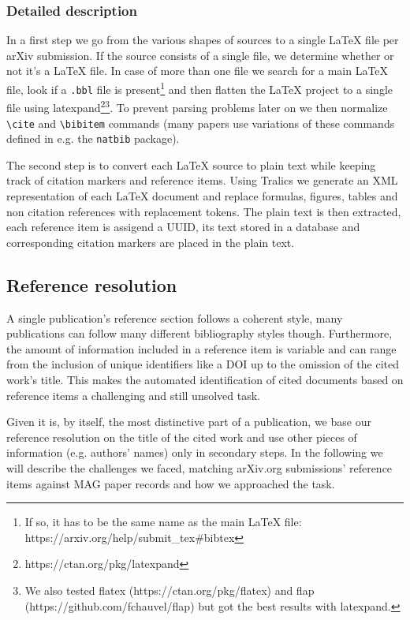 \subsubsection{Detailed description}
In a first step we go from the various shapes of sources to a single LaTeX file per arXiv submission. If the source consists of a single file, we determine whether or not it's a LaTeX file. In case of more than one file we search for a main LaTeX file, look if a \texttt{.bbl} file is present\footnote{If so, it has to be the same name as the main LaTeX file: https://arxiv.org/help/submit\_tex\#bibtex} and then flatten the LaTeX project to a single file using latexpand\footnote{https://ctan.org/pkg/latexpand}\footnote{We also tested flatex (https://ctan.org/pkg/flatex) and flap (https://github.com/fchauvel/flap) but got the best results with latexpand.}. To prevent parsing problems later on we then normalize \texttt{\textbackslash cite} and \texttt{\textbackslash bibitem} commands (many papers use variations of these commands defined in e.g. the \texttt{natbib} package).

The second step is to convert each LaTeX source to plain text while keeping track of citation markers and reference items. Using Tralics we generate an XML representation of each LaTeX document and replace formulas, figures, tables and non citation references with replacement tokens. The plain text is then extracted, each reference item is assigend a UUID, its text stored in a database and corresponding citation markers are placed in the plain text.

\subsection{Reference resolution}
A single publication's reference section follows a coherent style, many publications can follow many different bibliography styles though. Furthermore, the amount of information included in a reference item is variable and can range from the inclusion of unique identifiers like a DOI up to the omission of the cited work's title. This makes the automated identification of cited documents based on reference items a challenging and still unsolved task\cite{Nasar2018}.

Given it is, by itself, the most distinctive part of a publication, we base our reference resolution on the title of the cited work and use other pieces of information (e.g. authors' names) only in secondary steps. In the following we will describe the challenges we faced, matching arXiv.org submissions' reference items against MAG paper records and how we approached the task.

